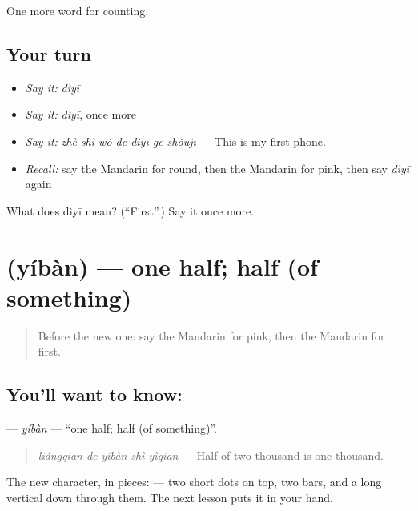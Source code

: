 \begin{grammarlens}[title={What you've built}]
One more word for counting.
\end{grammarlens}

\subsection*{Your turn}
\begin{itemize}
\raggedright
  \item \emph{Say it:} \emph{dìyī}
  \item \emph{Say it:} \emph{dìyī}, once more
  \item \emph{Say it:} \emph{zhè shì wǒ de dìyī ge shǒujī} — This is my first phone.
  \item \emph{Recall:} say the Mandarin for round, then the Mandarin for pink, then say \emph{dìyī} again
\end{itemize}

\begin{tcolorbox}[breakable,colback=teal!4,colframe=teal!35!black,title={Before you move on}]
What does dìyī mean? (\textquotedblleft{}First\textquotedblright{}.) Say it once more.
\end{tcolorbox}
\section[\texorpdfstring{\zh{一半} (yíbàn)}{一半 (yíbàn)}]{ (yíbàn) — one half; half (of something)}

\label{lesson:ZH-C140-yiban}



\begin{quote}
Before the new one: say the Mandarin for pink, then the Mandarin for first.
\end{quote}

\subsection*{You'll want to know: }
\textbf{} — \emph{yíbàn} — \textquotedblleft{}one half; half (of something)\textquotedblright{}.

\begin{quote}
\textbf{} \emph{liǎngqiān de yíbàn shì yìqiān} — Half of two thousand is one thousand.
\end{quote}

The new character, in pieces:  — two short dots on top, two bars, and a long vertical down through them. The next lesson puts it in your hand.

